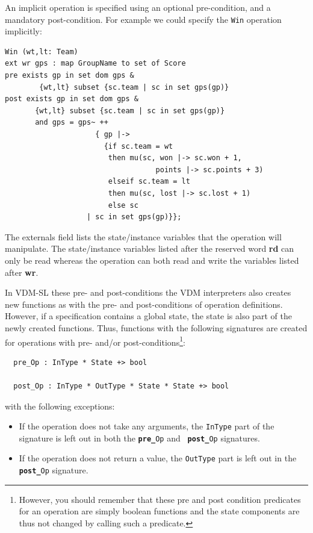 \documentclass{overturerepchap}
\newcommand{\keyw}[1]{{\bf\ttfamily #1}}
\begin{document}
\begin{description}
An implicit operation is specified using an optional pre-condition,
and a mandatory post-condition. For example we could specify the
\texttt{Win} operation implicitly:
\begin{lstlisting}
Win (wt,lt: Team)
ext wr gps : map GroupName to set of Score
pre exists gp in set dom gps & 
        {wt,lt} subset {sc.team | sc in set gps(gp)}
post exists gp in set dom gps &
       {wt,lt} subset {sc.team | sc in set gps(gp)}
       and gps = gps~ ++ 
                     { gp |-> 
                       {if sc.team = wt
                        then mu(sc, won |-> sc.won + 1,
                                   points |-> sc.points + 3)
                        elseif sc.team = lt
                        then mu(sc, lost |-> sc.lost + 1)
                        else sc 
                   | sc in set gps(gp)}};
\end{lstlisting}

The externals field lists the state/instance
variables that the
operation will manipulate. The 
state/instance
variables listed after the reserved
word \keyw{rd} can only be read whereas the operation can both read and
write the variables listed after \keyw{wr}. 
 
In VDM-SL these pre- and post-conditions the VDM interpreters also
creates new functions as with the pre- and post-conditions of operation
definitions.  However, if a specification contains a global state, the
state is also part of the newly created functions. Thus, functions
with the following signatures are created for operations with pre-
and/or post-conditions\footnote{However, you should remember that
these pre and post condition predicates for an operation are simply
boolean functions and the state components are thus not changed by
calling such a predicate.}:
\begin{lstlisting}
  pre_Op : InType * State +> bool

  post_Op : InType * OutType * State * State +> bool
\end{lstlisting}
with the following exceptions:
\begin{itemize}
\item If the operation does not take any arguments, the {\tt InType} part
  of the signature is left out in both the {\tt \keyw{pre\_}Op} and {\tt
    \keyw{post\_}Op} signatures.

\item If the operation does not return a value, the {\tt OutType} part is
  left out in the {\tt \keyw{post\_}Op} signature.


\end{itemize}
\end{description}
\end{document}

